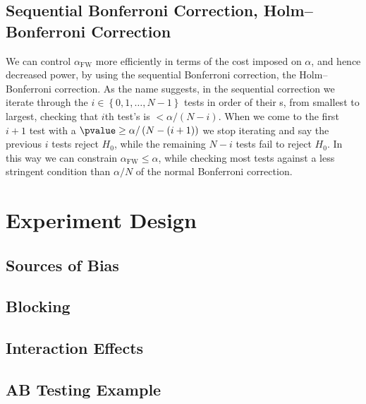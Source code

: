 \subsection{Sequential Bonferroni Correction, \ie Holm--Bonferroni Correction}
\label{hypo:bonferroni_correction:sequential}

We can control $\alpha_{\text{FW}}$ more efficiently in terms of the cost imposed on $\alpha$, and hence decreased power,
by using the sequential Bonferroni correction, \ie the Holm--Bonferroni correction.
As the name suggests, in the sequential correction
we iterate through the $i \in \left\{0, 1, \ldots, N-1\right\}$ tests
in order of their {\pvalue}s, from smallest to largest,
checking that $i$th test's \pvalue is $< \alpha / \left(N-i\right)$.
When we come to the first $i+1$ test with a $\pvalue \geq \alpha / \left(N-\left(i+1\right)\right)$
we stop iterating and say the previous $i$ tests reject $H_{0}$,
while the remaining $N-i$ tests fail to reject $H_{0}$.
In this way we can constrain $\alpha_{\text{FW}} \leq \alpha$,
while checking most tests against a less stringent condition
than $\alpha / N$ of the normal Bonferroni correction.

\section{Experiment Design}
\label{hypo:experiment}

\subsection{Sources of Bias}
\label{hypo:experiment:bias}

\subsection{Blocking}
\label{hypo:experiment:blocking}

\subsection{Interaction Effects}
\label{hypo:experiment:interaction}

\subsection{AB Testing Example}
\label{hypo:experiment:AB}
